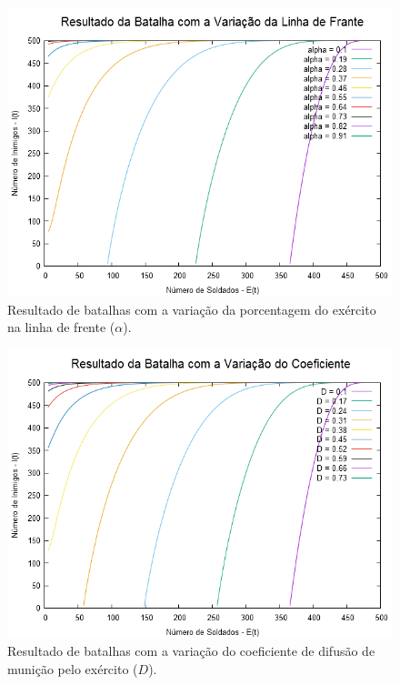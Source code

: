 \documentclass{article}
\begin{document}
\begin{figure}[ht]
	\centering
	\includegraphics[scale=0.4]{figs/battle_front_line_variation.png}
	\caption{Resultado de batalhas com a variação da porcentagem do exército na linha de frente ($\alpha$).}
	\label{fig:front-line-size-variation}
\end{figure}

\begin{figure}[ht]
	\centering
	\includegraphics[scale=0.4]{figs/battle_ammo_diffusion_variation.png}
	\caption{Resultado de batalhas com a variação do coeficiente de difusão de munição pelo exército ($D$).}
	\label{fig:ammo-diffusion-variation}
\end{figure}
\end{document}
